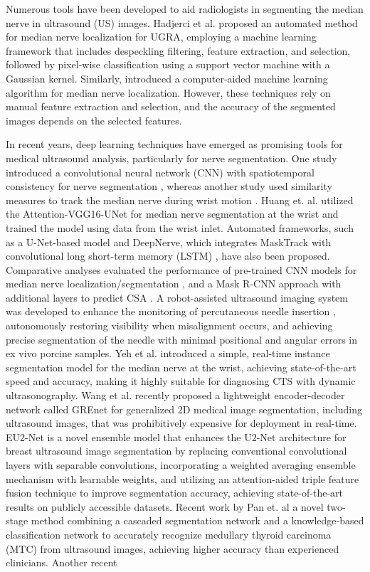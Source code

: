 Numerous tools have been developed to aid radiologists in segmenting the median nerve in ultrasound (US) images. Hadjerci et al. \cite{hadjerci2015ultrasound} proposed an automated method for median nerve localization for UGRA, employing a machine learning framework that includes despeckling filtering, feature extraction, and selection, followed by pixel-wise classification using a support vector machine with a Gaussian kernel. Similarly, \cite{hadjerci2016computer} introduced a computer-aided machine learning algorithm for median nerve localization. However, these techniques rely on manual feature extraction and selection, and the accuracy of the segmented images depends on the selected features.

In recent years, deep learning techniques have emerged as promising tools for medical ultrasound analysis, particularly for nerve segmentation. One study introduced a convolutional neural network (CNN) with spatiotemporal consistency for nerve segmentation \cite{hafiane2017deep}, whereas another study used similarity measures to track the median nerve during wrist motion \cite{wang2020mnt}. Huang et. al.\cite{huang2022attention} utilized the Attention-VGG16-UNet for median nerve segmentation at the wrist and trained the model using data from the wrist inlet. Automated frameworks, such as a U-Net-based model \cite{festen2021automated} and DeepNerve, which integrates MaskTrack with convolutional long short-term memory (LSTM) \cite{horng2020deepnerve}, have also been proposed. Comparative analyses evaluated the performance of pre-trained CNN models for median nerve localization/segmentation \cite{wu2021automated}, and a Mask R-CNN approach with additional layers to predict CSA \cite{di2022deep}.  A robot-assisted ultrasound imaging system was developed to enhance the monitoring of percutaneous needle insertion \cite{needleims}, autonomously restoring visibility when misalignment occurs, and achieving precise segmentation of the needle with minimal positional and angular errors in ex vivo porcine samples. Yeh et al. \cite{yeh2023real} introduced a simple, real-time instance segmentation model for the median nerve at the wrist, achieving state-of-the-art speed and accuracy, making it highly suitable for diagnosing CTS with dynamic ultrasonography. Wang et al. \cite{wangtnnls} recently proposed a lightweight encoder-decoder network called GREnet for generalized 2D medical image segmentation, including ultrasound images, that was prohibitively expensive for deployment in real-time. EU2-Net \cite{sarkarims} is a novel ensemble model that enhances the U2-Net architecture for breast ultrasound image segmentation by replacing conventional convolutional layers with separable convolutions, incorporating a weighted averaging ensemble mechanism with learnable weights, and utilizing an attention-aided triple feature fusion technique to improve segmentation accuracy, achieving state-of-the-art results on publicly accessible datasets. Recent work by Pan et. al \cite{pan2022} a novel two-stage method combining a cascaded segmentation network and a knowledge-based classification network to accurately recognize medullary thyroid carcinoma (MTC) from ultrasound images, achieving higher accuracy than experienced clinicians. Another recent 